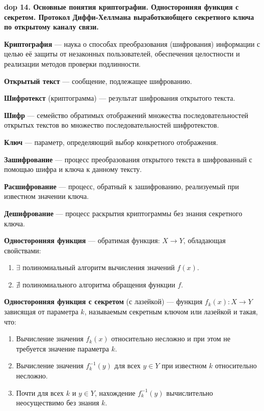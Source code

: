 \textbf{\LARGE dop 14. Основные  понятия  криптографии.  Односторонняя  функция  с  секретом.  Протокол  Диффи-Хеллмана выработкиобщего секретного ключа по открытому каналу связи.}

\textbf{Криптография} --- наука о способах преобразования (шифрования) информации с целью её защиты от незаконных пользователей, обеспечения целостности и реализации методов проверки подлинности.

\textbf{Открытый текст} --- сообщение, подлежащее шифрованию.

\textbf{Шифротекст} (криптограмма) --- результат шифрования открытого текста.

\textbf{Шифр} --- семейство обратимых отображений множества последовательностей открытых текстов во множество последовательностей шифротекстов.

\textbf{Ключ} --- параметр, определяющий выбор конкретного отображения.

\textbf{Зашифрование} --- процесс преобразования открытого текста в шифрованный с помощью шифра и ключа к данному тексту.

\textbf{Расшифрование} --- процесс, обратный к зашифрованию, реализуемый при известном значении ключа.

\textbf{Дешифрование} --- процесс раскрытия криптограммы без знания секретного ключа.

\textbf{Односторонняя функция} --- обратимая функция: $X \rightarrow Y$, обладающая свойствами:
\begin{enumerate}
    \item $\exists$ полиномиальный алгоритм вычисления значений $f(x)$.
    \item $\nexists$ полиномиального алгоритма обращения функции $f$.
\end{enumerate}

\textbf{Односторонняя функция с секретом} (с лазейкой) — функция $f_k(x): X \rightarrow Y$ зависящая от параметра $k$, называемым секретным ключом или лазейкой и такая, что:
\begin{enumerate}
    \item Вычисление значения $f_k(x)$ относительно несложно и при этом не требуется значение параметра $k$.
    \item Вычисление значения $f^{-1}_k(y)$ для всех $y \in Y$ при известном $k$ относительно несложно.
    \item Почти для всех $k$ и $y \in Y$, нахождение $f^{-1}_k(y)$ вычислительно неосуществимо без знания $k$.
\end{enumerate}

